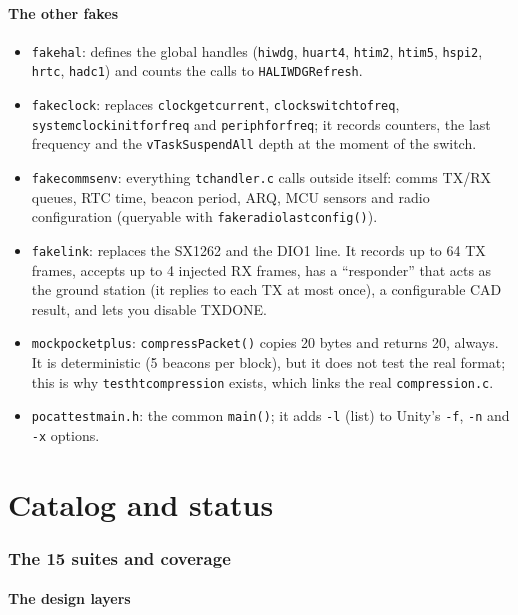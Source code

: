 \documentclass[11pt,a4paper]{article}
\DeclareRobustCommand{\_}{\textunderscore\allowbreak}
\newcommand{\cd}[1]{\texttt{#1}}
\begin{document}
\subsection{The other fakes}
\begin{itemize}
\item \cd{fake\_hal}: defines the global handles (\cd{hiwdg}, \cd{huart4}, \cd{htim2}, \cd{htim5},
  \cd{hspi2}, \cd{hrtc}, \cd{hadc1}) and counts the calls to \cd{HAL\_IWDG\_Refresh}.
\item \cd{fake\_clock}: replaces \cd{clock\_get\_current}, \cd{clock\_switch\_to\_freq},
  \cd{systemclock\_init\_for\_freq} and \cd{periph\_*\_for\_freq}; it records counters, the last
  frequency and the \cd{vTaskSuspendAll} depth at the moment of the switch.
\item \cd{fake\_comms\_env}: everything \cd{tc\_handler.c} calls outside itself: comms TX/RX
  queues, RTC time, beacon period, ARQ, MCU sensors and radio configuration
  (queryable with \cd{fake\_radio\_last\_config()}).
\item \cd{fake\_link}: replaces the SX1262 and the DIO1 line. It records up to 64 TX frames, accepts up
  to 4 injected RX frames, has a ``responder'' that acts as the ground station (it replies to each TX at
  most once), a configurable CAD result, and lets you disable TX\_DONE.
\item \cd{mock\_pocket\_plus}: \cd{compressPacket()} copies 20 bytes and returns 20, always. It is
  deterministic (5 beacons per block), but it does not test the real format; this is why
  \cd{test\_ht\_compression} exists, which links the real \cd{compression.c}.
\item \cd{pocat\_test\_main.h}: the common \cd{main()}; it adds \cd{-l} (list) to Unity's
  \cd{-f}, \cd{-n} and \cd{-x} options.
\end{itemize}
\part{Catalog and status}

\section{The 15 suites and coverage}\label{sec:suites}

\subsection{The design layers}
\end{document}

